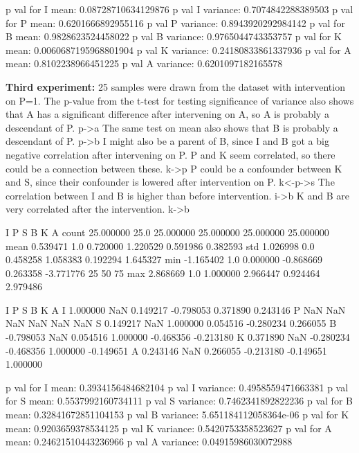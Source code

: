 \documentclass[12pt,fleqn,]{article}
\begin{document}
\begin{multicols}{2}
p val for I mean: 0.08728710634129876
p val I variance: 0.7074842288389503
p val for P mean: 0.6201666892955116
p val P variance: 0.8943920292984142
p val for B mean: 0.9828623524458022
p val B variance: 0.9765044743353757
p val for K mean: 0.0060687195968801904
p val K variance: 0.24180833861337936
p val for A mean: 0.8102238966451225
p val A variance: 0.6201097182165578


\textbf{Third experiment:} 25 samples were drawn from the dataset with intervention on P=1. 
The p-value from the t-test for testing significance of variance also shows that A has a significant difference after intervening on A, so A is probably a descendant of P. 
p->a
The same test on mean also shows that B is probably a descendant of P. 
p->b
I might also be a parent of B, since I and B got a big negative correlation after intervening on P.
P and K seem correlated, so there could be a connection between these.
k->p
P could be a confounder between K and S, since their confounder is lowered after intervention on P.
k<-p->s
The correlation between I and B is higher than before intervention.
i->b
K and B are very correlated after the intervention.
k->b


            I     P          S          B          K          A
count  25.000000  25.0  25.000000  25.000000  25.000000  25.000000
mean    0.539471   1.0   0.720000   1.220529   0.591986   0.382593
std     1.026998   0.0   0.458258   1.058383   0.192294   1.645327
min    -1.165402   1.0   0.000000  -0.868669   0.263358  -3.771776
25%
50%
75%
max     2.868669   1.0   1.000000   2.966447   0.924464   2.979486

          I   P         S         B         K         A
I  1.000000 NaN  0.149217 -0.798053  0.371890  0.243146
P       NaN NaN       NaN       NaN       NaN       NaN
S  0.149217 NaN  1.000000  0.054516 -0.280234  0.266055
B -0.798053 NaN  0.054516  1.000000 -0.468356 -0.213180
K  0.371890 NaN -0.280234 -0.468356  1.000000 -0.149651
A  0.243146 NaN  0.266055 -0.213180 -0.149651  1.000000

p val for I mean: 0.3934156484682104
p val I variance: 0.4958559471663381
p val for S mean: 0.5537992160734111
p val S variance: 0.7462341892822236
p val for B mean: 0.32841672851104153
p val B variance: 5.651184112058364e-06
p val for K mean: 0.9203659378534125
p val K variance: 0.5420753358523627
p val for A mean: 0.24621510443236966
p val A variance: 0.04915986030072988


\end{multicols}
\end{document}
